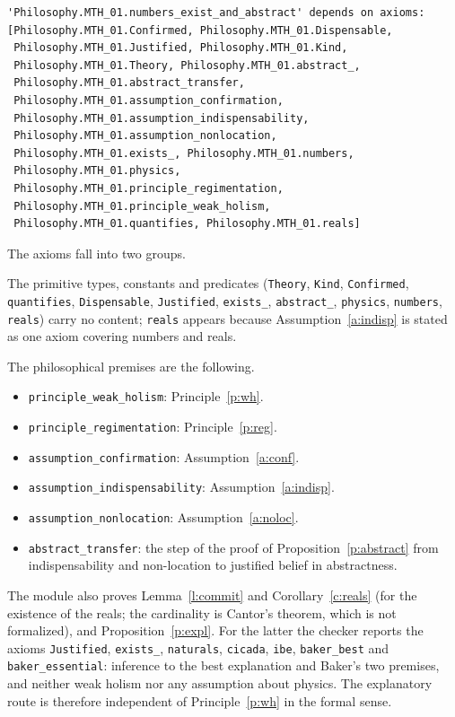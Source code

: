 \documentclass{situationist-preprint}
\begin{document}
\begin{lstlisting}
'Philosophy.MTH_01.numbers_exist_and_abstract' depends on axioms:
[Philosophy.MTH_01.Confirmed, Philosophy.MTH_01.Dispensable,
 Philosophy.MTH_01.Justified, Philosophy.MTH_01.Kind,
 Philosophy.MTH_01.Theory, Philosophy.MTH_01.abstract_,
 Philosophy.MTH_01.abstract_transfer,
 Philosophy.MTH_01.assumption_confirmation,
 Philosophy.MTH_01.assumption_indispensability,
 Philosophy.MTH_01.assumption_nonlocation,
 Philosophy.MTH_01.exists_, Philosophy.MTH_01.numbers,
 Philosophy.MTH_01.physics,
 Philosophy.MTH_01.principle_regimentation,
 Philosophy.MTH_01.principle_weak_holism,
 Philosophy.MTH_01.quantifies, Philosophy.MTH_01.reals]
\end{lstlisting}

The axioms fall into two groups. {\raggedright The primitive types, constants and predicates (\texttt{Theory}, \texttt{Kind}, \texttt{Confirmed}, \texttt{quantifies}, \texttt{Dispensable}, \texttt{Justified}, \texttt{exists\_}, \texttt{abstract\_}, \texttt{physics}, \texttt{numbers}, \texttt{reals}) carry no content; \texttt{reals} appears because Assumption~\ref{a:indisp} is stated as one axiom covering numbers and reals.\par} The philosophical premises are the following.
\begin{itemize}
\item \texttt{principle\_weak\_holism}: Principle~\ref{p:wh}.
\item \texttt{principle\_regimentation}: Principle~\ref{p:reg}.
\item \texttt{assumption\_confirmation}: Assumption~\ref{a:conf}.
\item \texttt{assumption\_indispensability}: Assumption~\ref{a:indisp}.
\item \texttt{assumption\_nonlocation}: Assumption~\ref{a:noloc}.
\item \texttt{abstract\_transfer}: the step of the proof of Proposition~\ref{p:abstract} from indispensability and non-location to justified belief in abstractness.
\end{itemize}
The module also proves Lemma~\ref{l:commit} and Corollary~\ref{c:reals} (for the existence of the reals; the cardinality is Cantor's theorem, which is not formalized), and Proposition~\ref{p:expl}. For the latter the checker reports the axioms \texttt{Justified}, \texttt{exists\_}, \texttt{naturals}, \texttt{cicada}, \texttt{ibe}, \texttt{baker\_best} and \texttt{baker\_essential}: inference to the best explanation and Baker's two premises, and neither weak holism nor any assumption about physics. The explanatory route is therefore independent of Principle~\ref{p:wh} in the formal sense.
\end{document}
